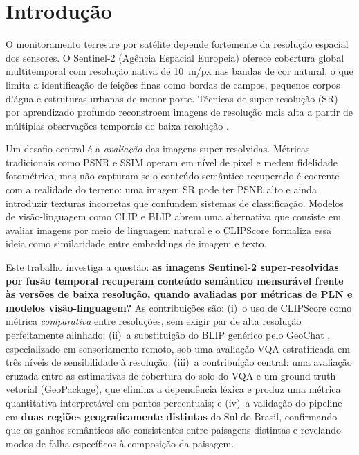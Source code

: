 \documentclass[12pt]{article}
\begin{document}
\section{Introdução}

O monitoramento terrestre por satélite depende fortemente da resolução
espacial dos sensores. O Sentinel-2 (Agência Espacial Europeia) oferece
cobertura global multitemporal com resolução nativa de 10~m/px nas bandas
de cor natural, o que limita a identificação de feições finas como bordas
de campos, pequenos corpos d'água e estruturas urbanas de menor porte.
Técnicas de super-resolução (SR) por aprendizado profundo reconstroem
imagens de resolução mais alta a partir de múltiplas observações
temporais de baixa resolução \cite{dong:2016,nguyen:2021}.

Um desafio central é a \textit{avaliação} das imagens super-resolvidas.
Métricas tradicionais como PSNR e SSIM operam em nível de pixel e medem
fidelidade fotométrica, mas não capturam se o conteúdo semântico
recuperado é coerente com a realidade do terreno: uma imagem SR pode ter
PSNR alto e ainda introduzir texturas incorretas que confundem sistemas
de classificação. Modelos de visão-linguagem como CLIP \cite{radford:2021}
e BLIP \cite{li:2022} abrem uma alternativa que consiste em avaliar imagens por meio
de linguagem natural e o CLIPScore \cite{hessel:2021} formaliza essa
ideia como similaridade entre embeddings de imagem e texto.

Este trabalho investiga a questão: \textbf{as imagens Sentinel-2
super-resolvidas por fusão temporal recuperam conteúdo semântico
mensurável frente às versões de baixa resolução, quando avaliadas por
métricas de PLN e modelos visão-linguagem?} As contribuições são:
(i)~o uso de CLIPScore como métrica \emph{comparativa} entre resoluções,
sem exigir par de alta resolução perfeitamente alinhado;
(ii)~a substituição do BLIP genérico pelo GeoChat
\cite{kuckreja:2024}, especializado em sensoriamento remoto, sob uma
avaliação VQA estratificada em três níveis de sensibilidade à resolução;
(iii)~a contribuição central: uma avaliação cruzada entre as estimativas
de cobertura do solo do VQA e um ground truth vetorial (GeoPackage), que
elimina a dependência léxica e produz uma métrica quantitativa
interpretável em pontos percentuais; e (iv)~a validação do pipeline em
\textbf{duas regiões geograficamente distintas} do Sul do Brasil,
confirmando que os ganhos semânticos são consistentes entre paisagens
distintas e revelando modos de falha específicos à composição da
paisagem.
\end{document}
